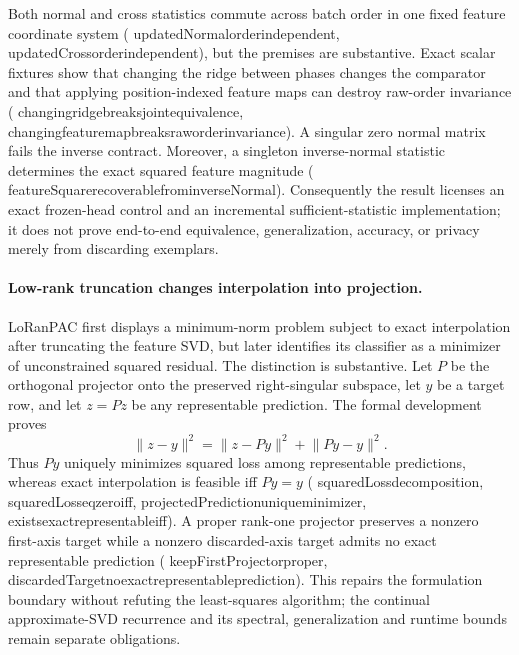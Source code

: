 \documentclass[11pt]{article}
\newcommand{\leanname}[1]{{\scriptsize\ttfamily
  \def\_{\textunderscore\allowbreak}#1}}
\begin{document}
Both normal and cross statistics commute across batch order in one fixed
feature coordinate system
(\leanname{updatedNormal\_order\_independent},
\leanname{updatedCross\_order\_independent}), but the premises are
substantive. Exact scalar fixtures show that changing the ridge between
phases changes the comparator and that applying position-indexed feature
maps can destroy raw-order invariance
(\leanname{changing\_ridge\_breaks\_joint\_equivalence},
\leanname{changing\_feature\_map\_breaks\_raw\_order\_invariance}).
A singular zero normal matrix fails the inverse contract. Moreover, a
singleton inverse-normal statistic determines the exact squared feature
magnitude
(\leanname{featureSquare\_recoverable\_from\_inverseNormal}).
Consequently the result licenses an exact frozen-head control and an
incremental sufficient-statistic implementation; it does not prove
end-to-end equivalence, generalization, accuracy, or privacy merely from
discarding exemplars.

\paragraph{Low-rank truncation changes interpolation into projection.}
LoRanPAC \cite{peng2024loranpac} first displays a minimum-norm problem
subject to exact interpolation after truncating the feature SVD, but later
identifies its classifier as a minimizer of unconstrained squared residual.
The distinction is substantive.  Let $P$ be the orthogonal projector onto
the preserved right-singular subspace, let $y$ be a target row, and let
$z=Pz$ be any representable prediction.  The formal development proves
\[
  \lVert z-y\rVert^2
  =\lVert z-Py\rVert^2+\lVert Py-y\rVert^2 .
\]
Thus $Py$ uniquely minimizes squared loss among representable predictions,
whereas exact interpolation is feasible iff $Py=y$
(\leanname{squaredLoss\_decomposition},
\leanname{squaredLoss\_eq\_zero\_iff},
\leanname{projectedPrediction\_unique\_minimizer},
\leanname{exists\_exact\_representable\_iff}).
A proper rank-one projector preserves a nonzero first-axis target while a
nonzero discarded-axis target admits no exact representable prediction
(\leanname{keepFirstProjector\_proper},
\leanname{discardedTarget\_no\_exact\_representable\_prediction}).
This repairs the formulation boundary without refuting the least-squares
algorithm; the continual approximate-SVD recurrence and its spectral,
generalization and runtime bounds remain separate obligations.
\end{document}
